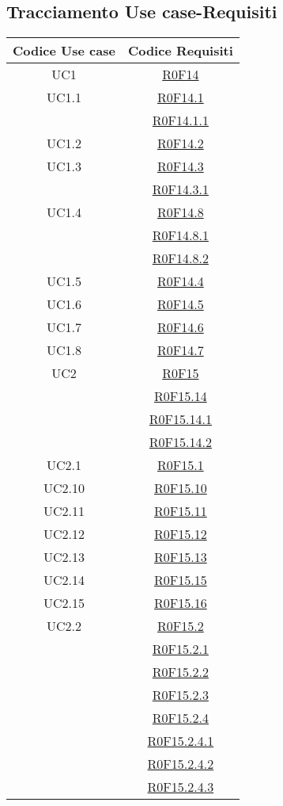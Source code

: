 \documentclass[../AnalisiDeiRequisiti.tex]{subfiles}
\begin{document}
\subsection{Tracciamento Use case-Requisiti}
\normalsize
\begin{longtable}{|c|c|}
	\hline
	\textbf{Codice Use case} & \textbf{Codice Requisiti} \\
	\hline
	\endhead
	UC1 & \hyperlink{R0F14}{R0F14}\\\hline
	UC1.1 & \hyperlink{R0F14.1}{R0F14.1}\\& \hyperlink{R0F14.1.1}{R0F14.1.1}\\\hline
	UC1.2 & \hyperlink{R0F14.2}{R0F14.2}\\\hline
	UC1.3 & \hyperlink{R0F14.3}{R0F14.3}\\& \hyperlink{R0F14.3.1}{R0F14.3.1}\\\hline
	UC1.4 & \hyperlink{R0F14.8}{R0F14.8}\\& \hyperlink{R0F14.8.1}{R0F14.8.1}\\& \hyperlink{R0F14.8.2}{R0F14.8.2}\\\hline
	UC1.5 & \hyperlink{R0F14.4}{R0F14.4}\\\hline
	UC1.6 & \hyperlink{R0F14.5}{R0F14.5}\\\hline
	UC1.7 & \hyperlink{R0F14.6}{R0F14.6}\\\hline
	UC1.8 & \hyperlink{R0F14.7}{R0F14.7}\\\hline
	UC2 & \hyperlink{R0F15}{R0F15}\\& \hyperlink{R0F15.14}{R0F15.14}\\& \hyperlink{R0F15.14.1}{R0F15.14.1}\\& \hyperlink{R0F15.14.2}{R0F15.14.2}\\\hline
	UC2.1 & \hyperlink{R0F15.1}{R0F15.1}\\\hline
	UC2.10 & \hyperlink{R0F15.10}{R0F15.10}\\\hline
	UC2.11 & \hyperlink{R0F15.11}{R0F15.11}\\\hline
	UC2.12 & \hyperlink{R0F15.12}{R0F15.12}\\\hline
	UC2.13 & \hyperlink{R0F15.13}{R0F15.13}\\\hline
	UC2.14 & \hyperlink{R0F15.15}{R0F15.15}\\\hline
	UC2.15 & \hyperlink{R0F15.16}{R0F15.16}\\\hline
	UC2.2 & \hyperlink{R0F15.2}{R0F15.2}\\& \hyperlink{R0F15.2.1}{R0F15.2.1}\\& \hyperlink{R0F15.2.2}{R0F15.2.2}\\& \hyperlink{R0F15.2.3}{R0F15.2.3}\\& \hyperlink{R0F15.2.4}{R0F15.2.4}\\& \hyperlink{R0F15.2.4.1}{R0F15.2.4.1}\\& \hyperlink{R0F15.2.4.2}{R0F15.2.4.2}\\& \hyperlink{R0F15.2.4.3}{R0F15.2.4.3}\\\hline

\end{longtable}
\end{document}
